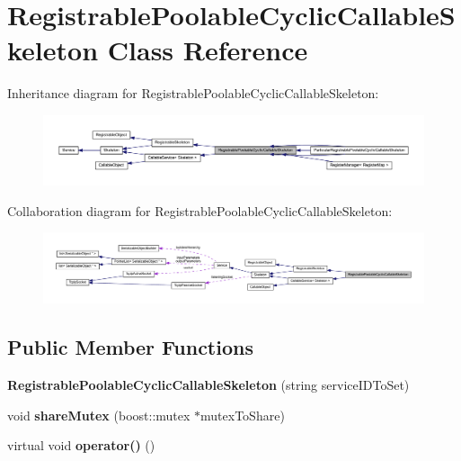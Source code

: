 \hypertarget{class_registrable_poolable_cyclic_callable_skeleton}{
\section{RegistrablePoolableCyclicCallableSkeleton Class Reference}
\label{class_registrable_poolable_cyclic_callable_skeleton}
}


Inheritance diagram for RegistrablePoolableCyclicCallableSkeleton:\nopagebreak
\begin{figure}[H]
\begin{center}
\leavevmode
\includegraphics[width=400pt]{class_registrable_poolable_cyclic_callable_skeleton__inherit__graph}
\end{center}
\end{figure}


Collaboration diagram for RegistrablePoolableCyclicCallableSkeleton:\nopagebreak
\begin{figure}[H]
\begin{center}
\leavevmode
\includegraphics[width=400pt]{class_registrable_poolable_cyclic_callable_skeleton__coll__graph}
\end{center}
\end{figure}
\subsection*{Public Member Functions}
\begin{DoxyCompactItemize}
\item 
\hypertarget{class_registrable_poolable_cyclic_callable_skeleton_a349164eca300df7f02d595134343917b}{
{\bfseries RegistrablePoolableCyclicCallableSkeleton} (string serviceIDToSet)}
\label{class_registrable_poolable_cyclic_callable_skeleton_a349164eca300df7f02d595134343917b}

\item 
\hypertarget{class_registrable_poolable_cyclic_callable_skeleton_a2aa9a7f51e19fe395bc34c454ff4e3dd}{
void {\bfseries shareMutex} (boost::mutex $\ast$mutexToShare)}
\label{class_registrable_poolable_cyclic_callable_skeleton_a2aa9a7f51e19fe395bc34c454ff4e3dd}

\item 
\hypertarget{class_registrable_poolable_cyclic_callable_skeleton_a078475f96c280ff5a8eacb6f502868ce}{
virtual void {\bfseries operator()} ()}
\label{class_registrable_poolable_cyclic_callable_skeleton_a078475f96c280ff5a8eacb6f502868ce}

\end{DoxyCompactItemize}



